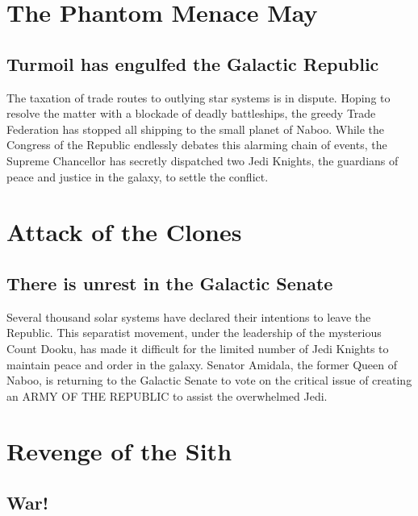 \documentclass[oneside]{ifgw}
\begin{document}
\lipsum[1-10]

\chapter{The Phantom Menace	May}

\section{Turmoil has engulfed the Galactic Republic}

The taxation of trade routes to outlying star systems is in dispute. Hoping to resolve the matter with a blockade of deadly battleships, the greedy Trade Federation has stopped all shipping to the small planet of Naboo. While the Congress of the Republic endlessly debates this alarming chain of events, the Supreme Chancellor has secretly dispatched two Jedi Knights, the guardians of peace and justice in the galaxy, to settle the conflict.

\lipsum[1-10]


\chapter{Attack of the Clones}	

\section{There is unrest in the Galactic Senate}

Several thousand solar systems have declared their intentions to leave the Republic. This separatist movement, under the leadership of the mysterious Count Dooku, has made it difficult for the limited number of Jedi Knights to maintain peace and order in the galaxy. Senator Amidala, the former Queen of Naboo, is returning to the Galactic Senate to vote on the critical issue of creating an ARMY OF THE REPUBLIC to assist the overwhelmed Jedi.

\lipsum[1-10]


\chapter{Revenge of the Sith}	

\section{War!}
\end{document}
